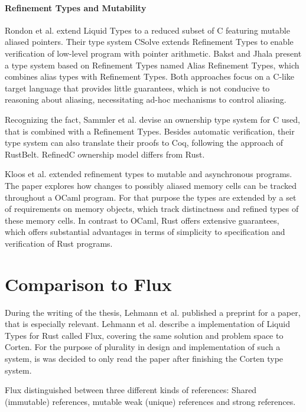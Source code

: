 \documentclass[twoside, english]{sdqthesis}
\theoremstyle{definition}
\begin{document}
\paragraph*{Refinement Types and Mutability} 

Rondon et al. \cite{rondon_low-level_2010} extend Liquid Types to a reduced subset of C featuring mutable aliased pointers. Their type system CSolve extends Refinement Types to enable verification of low-level program with pointer arithmetic.
Bakst and Jhala \cite{bakst_predicate_2016} present a type system based on Refinement Types named Alias Refinement Types, which combines alias types with Refinement Types.
Both approaches focus on a C-like target language that provides little guarantees, which is not conducive to reasoning about aliasing, necessitating ad-hoc mechanisms to control aliasing.

Recognizing the fact, Sammler et al. \cite{sammler_refinedc_2021} devise an ownership type system for C used, that is combined with a Refinement Types. 
Besides automatic verification, their type system can also translate their proofs to Coq, following the approach of RustBelt.
RefinedC ownership model differs from Rust.

Kloos et al. \cite{kloos_asynchronous_2015} extended refinement types to mutable and asynchronous programs. The paper explores how changes to possibly aliased memory cells can be tracked throughout a OCaml program. For that purpose the types are extended by a set of requirements on memory objects, which track distinctness and refined types of these memory cells. In contrast to OCaml, Rust offers extensive guarantees, which offers substantial advantages in terms of simplicity to specification and verification of Rust programs.


\section{Comparison to Flux} \label{sec:flux}

During the writing of the thesis, Lehmann et al. \cite{lehmann_flux_2022} published a preprint for a paper, that is especially relevant. Lehmann et al. describe a implementation of Liquid Types for Rust called Flux, covering the same solution and problem space to Corten. 
For the purpose of plurality in design and implementation of such a system, is was decided to only read the paper after finishing the Corten type system.

Flux distinguished between three different kinds of references: 
Shared (immutable) references, mutable weak (unique) references and strong references.
\end{document}
